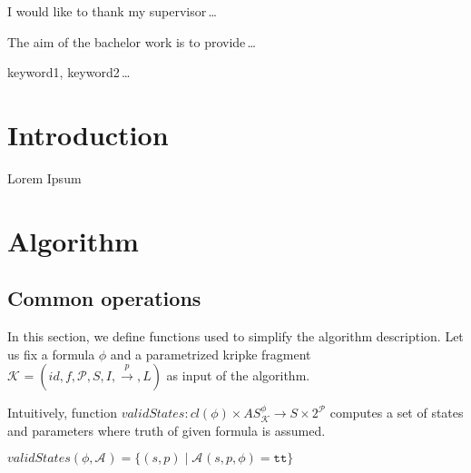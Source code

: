 \documentclass[12pt,oneside,draft]{fithesis2}
\newcommand{\as}[1][]{\ensuremath{\mathcal{A}_{#1}}}
\newcommand{\ASphi}{\ensuremath{AS_{\mathcal K}^\phi}}
\newcommand{\true}{\ensuremath{\texttt{tt}}}
\newcommand{\ks}[1][]{\ensuremath{\mathcal{K}_{#1}}}
\newcommand{\fullks}{\ensuremath{ \ks = (id, f, \params, S, I, \trans{p}, L) }}
\newcommand{\trans}[1]{\stackrel{#1}{\rightarrow}}
\newcommand{\params}{\mathcal{P}}
\begin{document}
  \FrontMatter                    %
    \ThesisTitlePage                %
    \begin{ThesisDeclaration}       %
      \DeclarationText
      \AdvisorName
    \end{ThesisDeclaration}
    \begin{ThesisThanks}            %
      I would like to thank my supervisor\,\dots
    \end{ThesisThanks}
    \begin{ThesisAbstract}          %
      The aim of the bachelor work is to provide\,\dots
    \end{ThesisAbstract}
    \begin{ThesisKeyWords}          %
      keyword1, keyword2\,\dots
    \end{ThesisKeyWords}
    \tableofcontents                %
  
  \MainMatter                     %
    \chapter{Introduction}          %
	Lorem Ipsum \cite{testCite}
    \chapter{Algorithm}
    	
    	\section{Common operations}
    		
    		In this section, we define functions used to simplify the algorithm description. Let us fix a formula $\phi$ and a parametrized kripke fragment $\fullks$ as input of the algorithm.
			
			Intuitively, function $validStates : cl(\phi) \times \ASphi \rightarrow S \times 2^\mathcal{P} $ computes a set of states and parameters where truth of given formula is assumed. 

			\begin{center}
				$validStates(\phi, \as) = \{ (s, p) \mid \as(s, p, \phi) = \true \} $
			\end{center}
			
\end{document}
